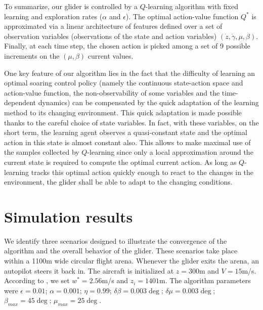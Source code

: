 \documentclass{ifacconf}
\begin{document}
To summarize, our glider is controlled by a $Q$-learning algorithm with fixed learning and exploration rates ($\alpha$ and $\epsilon$). The optimal action-value function $Q^{*}$ is approximated via a linear architecture of features defined over a set of observation variables (observations of the state and action variables) $\left(\dot{z}, \dot{\gamma}, \mu, \beta \right)$. Finally, at each time step, the chosen action is picked among a set of 9 possible increments on the $\left(\mu, \beta\right)$ current values.

One key feature of our algorithm lies in the fact that the difficulty of learning an optimal soaring control policy (namely the continuous state-action space and action-value function, the non-observability of some variables and the time-dependent dynamics) can be compensated by the quick adaptation of the learning method to its changing environment. This quick adaptation is made possible thanks to the careful choice of state variables. In fact, with these variables, on the short term, the learning agent observes a quasi-constant state and the optimal action in this state is almost constant also. This allows to make maximal use of the samples collected by $Q$-learning since only a local approximation around the current state is required to compute the optimal current action. As long as $Q$-learning tracks this optimal action quickly enough to react to the changes in the environment, the glider shall be able to adapt to the changing conditions.

\section{Simulation results}
\label{sec:results}

We identify three scenarios designed to illustrate the convergence of the algorithm and the overall behavior of the glider. These scenarios take place within a 1100m wide circular flight arena. Whenever the glider exits the arena, an autopilot steers it back in. The aircraft is initialized at $z=300$m and $V=15$m/s. According to \cite{allen_thermal}, we set $w^*=2.56$m/s and $z_i=1401$m. The algorithm parameters were $\epsilon = 0.01$; $\alpha = 0.001$; $\eta = 0.99$; $\delta \beta = 0.003\deg$; $\delta \mu = 0.003\deg$; $\beta_{max} = 45\deg$; $\mu_{max} = 25\deg$. 
\end{document}
